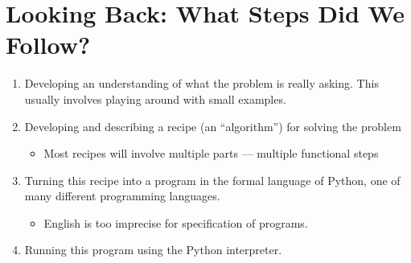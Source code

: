 \documentclass[letterpaper,10pt,english]{sphinxmanual}
\begin{document}
\section{Looking Back: What Steps Did We Follow?}
\label{\detokenize{lecture_notes/lec01_intro:looking-back-what-steps-did-we-follow}}\begin{enumerate}
\def\theenumi{\arabic{enumi}}
\def\labelenumi{\theenumi .}
\makeatletter\def\p@enumii{\p@enumi \theenumi .}\makeatother
\item {} 
Developing an understanding of what the problem is really asking.
This usually involves playing around with small examples.

\item {} 
Developing and describing a recipe (an “algorithm”) for solving the
problem
\begin{itemize}
\item {} 
Most recipes will involve multiple parts — multiple functional
steps

\end{itemize}

\item {} 
Turning this recipe into a program in the formal language of Python,
one of many different programming languages.
\begin{itemize}
\item {} 
English is too imprecise for specification of programs.

\end{itemize}

\item {} 
Running this program using the Python interpreter.

\end{enumerate}
\end{document}
